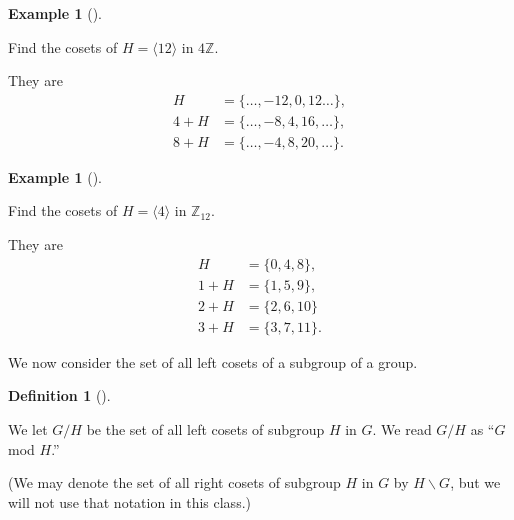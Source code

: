 \documentclass[10pt,]{book}
\theoremstyle{plain}
\theoremstyle{definition}
\newtheorem{definition}[theorem]{Definition}
\theoremstyle{definition}
\theoremstyle{definition}
\newtheorem{example}[theorem]{Example}
\theoremstyle{definition}
\numberwithin{equation}{section}
\def\Z{\mathbb{Z}}
\newcommand{\amp}{ & }
\begin{document}
\begin{example}[]\label{example-74}

        Find the cosets of \(H=\langle 12\rangle\) in \(4\Z\).
\par

        They are
\begin{align*}
H\amp =\{\ldots, -12,0,12\ldots\},\\
4+H \amp =
          \{\ldots,-8,4,16,\ldots\},\\
8+H\amp =\{\ldots, -4,8,20,\ldots\}.
\end{align*}

\end{example}
\begin{example}[]\label{z6_ex}

        Find the cosets of \(H=\langle 4\rangle\) in \(\Z_{12}\).
\par

        They are
\begin{align*}
H\amp =\{0,4,8\},\\
1+H \amp = \{1,5,9\},\\
2+H\amp =\{2,6,10\}\\
3+H\amp =\{3,7,11\}.
\end{align*}

\end{example}
\par

    We now consider the set of all left cosets of
    a subgroup of a group.
\begin{definition}[{}]\label{definition-61}

    We let \(G/H\) be the set of
    all left cosets of subgroup \(H\) in \(G\). We read \(G/H\) as ``\(G\)
    mod \(H\).'' %
\par
(We may denote the set of all right cosets of subgroup \(H\) in \(G\) by \(H\backslash G\), but we will  not use that notation in this class.)%
\label{notation-70}
\end{definition}
\typeout{************************************************}
\typeout{************************************************}
\end{document}
